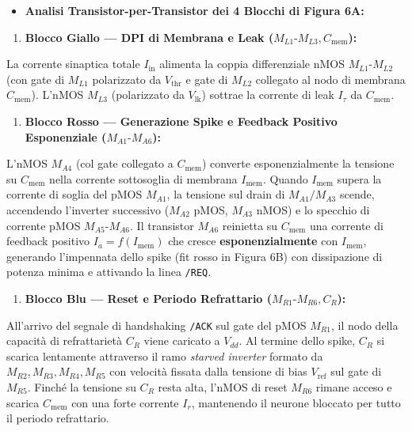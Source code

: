\documentclass[11pt,a4paper]{article}
\begin{document}
\begin{itemize}
  \item \textbf{Analisi Transistor-per-Transistor dei 4 Blocchi di Figura 6A:}
\end{itemize}
\begin{enumerate}
  \item \textbf{Blocco Giallo --- DPI di Membrana e Leak ($M_{L1}\text{-}M_{L3}, C_{\text{mem}}$):}
\end{enumerate}
La corrente sinaptica totale $I_{\text{in}}$ alimenta la coppia differenziale nMOS \textbf{$M_{L1}\text{-}M_{L2}$} (con gate di $M_{L1}$ polarizzato da $V_{\text{thr}}$ e gate di $M_{L2}$ collegato al nodo di membrana $C_{\text{mem}}$). L'nMOS \textbf{$M_{L3}$} (polarizzato da $V_{\text{lk}}$) sottrae la corrente di leak $I_\tau$ da $C_{\text{mem}}$.
\begin{enumerate}
  \item \textbf{Blocco Rosso --- Generazione Spike e Feedback Positivo Esponenziale ($M_{A1}\text{-}M_{A6}$):}
\end{enumerate}
L'nMOS \textbf{$M_{A4}$} (col gate collegato a $C_{\text{mem}}$) converte esponenzialmente la tensione su $C_{\text{mem}}$ nella corrente sottosoglia di membrana $I_{\text{mem}}$. Quando $I_{\text{mem}}$ supera la corrente di soglia del pMOS \textbf{$M_{A1}$}, la tensione sul drain di $M_{A1}/M_{A3}$ scende, accendendo l'inverter successivo ($M_{A2}$ pMOS, $M_{A3}$ nMOS) e lo specchio di corrente pMOS \textbf{$M_{A5}\text{-}M_{A6}$}. Il transistor \textbf{$M_{A6}$} reinietta su $C_{\text{mem}}$ una corrente di feedback positivo \textbf{$I_a = f(I_{\text{mem}})$} che cresce \textbf{esponenzialmente} con $I_{\text{mem}}$, generando l'impennata dello spike (fit rosso in Figura 6B) con dissipazione di potenza minima e attivando la linea \texttt{/REQ}.
\begin{enumerate}
  \item \textbf{Blocco Blu --- Reset e Periodo Refrattario ($M_{R1}\text{-}M_{R6}, C_R$):}
\end{enumerate}
All'arrivo del segnale di handshaking \texttt{/ACK} sul gate del pMOS \textbf{$M_{R1}$}, il nodo della capacità di refrattarietà \textbf{$C_R$} viene caricato a $V_{dd}$. Al termine dello spike, $C_R$ si scarica lentamente attraverso il ramo \textit{starved inverter} formato da \textbf{$M_{R2}, M_{R3}, M_{R4}, M_{R5}$} con velocità fissata dalla tensione di bias \textbf{$V_{\text{ref}}$} sul gate di $M_{R5}$. Finché la tensione su $C_R$ resta alta, l'nMOS di reset \textbf{$M_{R6}$} rimane acceso e scarica $C_{\text{mem}}$ con una forte corrente $I_r$, mantenendo il neurone bloccato per tutto il periodo refrattario.
\end{document}
